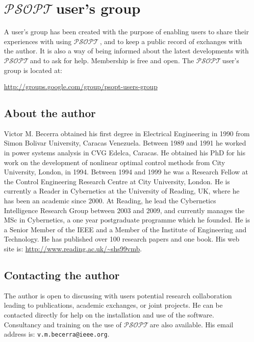 \documentclass[a4paper,11pt]{report}    %
\newcommand{\psopt}{$\mathcal{PSOPT}$\,}  %
\begin{document}
\section{\psopt user's group}

A user's group has been created with the purpose of enabling users to share their experiences with using \psopt, 
and to keep a public record of exchanges with the author. It is also a way of being informed about the latest
developments with \psopt and to ask for help. Membership is free and open. The  \psopt user's group is located at:

\href{http://groups.google.com/group/psopt-users-group}{http://groups.google.com/group/psopt-users-group}



\subsection{About the author}

Victor M. Becerra obtained his first degree in Electrical Engineering in 1990 from Simon Bolivar
University, Caracas Venezuela. Between 1989 and 1991 he worked in power systems analysis in CVG Edelca,
Caracas. He obtained his PhD for his work on the development of nonlinear optimal control methods
from City University, London, in 1994.  Between 1994 and 1999 he was a Research Fellow at the Control
Engineering Research Centre at City University, London. He is currently a Reader in Cybernetics at the University of Reading, 
UK, where he has been an academic since 2000. At Reading, he lead the Cybernetics Intelligence Research Group
between 2003 and 2009, and currently manages the MSc in Cybernetics, a one year postgraduate programme which he founded. 
He is a Senior Member of the IEEE and a Member of the Institute of Engineering and Technology. 
He has published over 100 research papers and one book. His web site is: \href{http://www.reading.ac.uk/~shs99vmb}{http://www.reading.ac.uk/\~{}shs99vmb}.


\subsection{Contacting the author}


The author is open to discussing with users potential research collaboration 
leading to publications, academic exchanges, or joint projects. He can be contacted directly for help
on the installation and use of the software. Consultancy and training on the use of  \psopt are 
also available. His email address is:  \texttt{v.m.becerra@ieee.org}.
\end{document}
